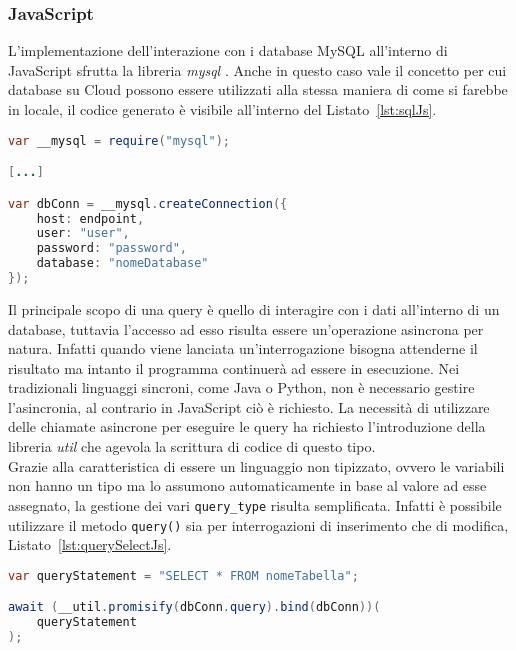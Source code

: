 \subsubsection{JavaScript}
L'implementazione dell'interazione con i database MySQL all'interno di JavaScript sfrutta la libreria \textit{mysql} \cite{mysqlnpm}. Anche in questo caso vale il concetto per cui database su Cloud possono essere utilizzati alla stessa maniera di come si farebbe in locale, il codice generato è visibile all'interno del Listato~\ref{lst:sqlJs}.\\

\begin{lstlisting}[language=Java,caption={Codice JavaScript generato per la variabile di tipo sql.}, label={lst:sqlJs}]
var __mysql = require("mysql");

[...]

var dbConn = __mysql.createConnection({
    host: endpoint,
    user: "user",
    password: "password",
    database: "nomeDatabase"
});
\end{lstlisting}

Il principale scopo di una query è quello di interagire con i dati all'interno di un database, tuttavia l'accesso ad esso risulta essere un'operazione asincrona per natura. Infatti quando viene lanciata un'interrogazione bisogna attenderne il risultato ma intanto il programma continuerà ad essere in esecuzione. Nei tradizionali linguaggi sincroni, come Java o Python, non è necessario gestire l'asincronia, al contrario in JavaScript ciò è richiesto. La necessità di utilizzare delle chiamate asincrone per eseguire le query ha richiesto l'introduzione della libreria \textit{util} \cite{util} che agevola la scrittura di codice di questo tipo.\\
Grazie alla caratteristica di essere un linguaggio non tipizzato, ovvero le variabili non hanno un tipo ma lo assumono automaticamente in base al valore ad esse assegnato, la gestione dei vari \verb|query_type| risulta semplificata. Infatti è possibile utilizzare il metodo \verb|query()| sia per interrogazioni di inserimento che di modifica, Listato~\ref{lst:querySelectJs}. \\

\begin{lstlisting}[language=Java,caption={Codice JavaScript generato per la variabile di tipo query per l'esecuzione di un'interrogazione di selezione che utilizza una stringa di testo.}, label={lst:querySelectJs}]
var queryStatement = "SELECT * FROM nomeTabella";

await (__util.promisify(dbConn.query).bind(dbConn))(
    queryStatement
);
\end{lstlisting}

